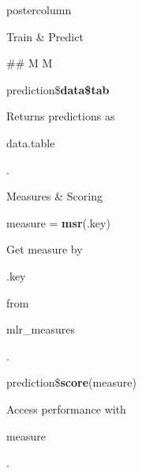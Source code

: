 \documentclass{beamer}
\newcommand{\codeinline}[1]{\begin{codeboxinline}#1\end{codeboxinline}}
\begin{document}
\begin{frame}[fragile]{}
\begin{columns}
\begin{column}{.245\textwidth}
\begin{beamercolorbox}[center]{postercolumn}
\begin{minipage}{.98\textwidth}
{\begin{myblock}{Train \& Predict}
\begin{codeboxmultiline}[width=23cm]
{							\#\# \space\space{}
							\space\space\space\space M \space\space\space\space\space\space\space M}
                        \end{codeboxmultiline}
						\vspace{1em}
						\begin{codebox}
							prediction\$\textbf{data\$tab}
						\end{codebox}
						Returns predictions as \codeinline{data.table}.
                       \end{myblock}
                       \begin{myblock}{Measures \& Scoring}
							\begin{codebox}
								measure = \textbf{msr}(.key)
							\end{codebox}
							Get measure by \codeinline{.key} from \codeinline{mlr\_measures}.
							\\
							\begin{codebox}
								prediction\$\textbf{score}(measure)
							\end{codebox}
							Access performance with \codeinline{measure}.
					\end{myblock}
					\vfill
					}
				\end{minipage}
			\end{beamercolorbox}
		\end{column}
	\end{columns}
\end{frame}
\end{document}
